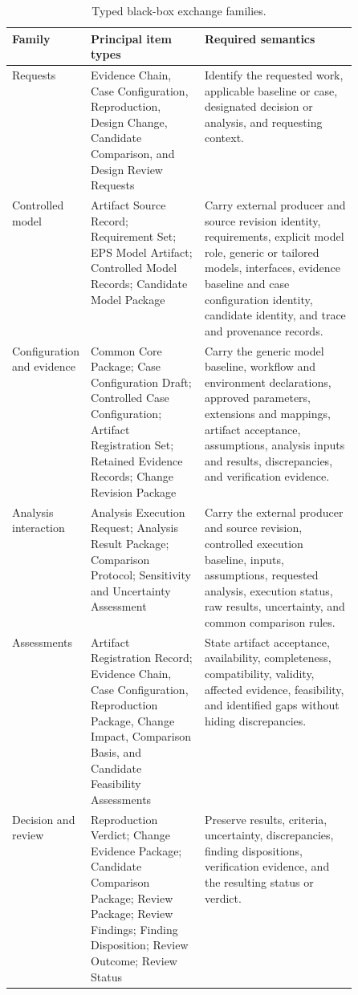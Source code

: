 \documentclass[11pt,a4paper]{article}
\begin{document}
\begin{table}[H]
    \centering
    \small
    \caption{Typed black-box exchange families.}
    \label{tab:framework-exchange-types}
    \begin{tabularx}{\linewidth}{>{\raggedright\arraybackslash}p{0.17\linewidth} >{\raggedright\arraybackslash}p{0.33\linewidth} X}
        \toprule
        \textbf{Family} & \textbf{Principal item types} & \textbf{Required semantics} \\
        \midrule
        Requests & Evidence Chain, Case Configuration, Reproduction, Design Change, Candidate Comparison, and Design Review Requests & Identify the requested work, applicable baseline or case, designated decision or analysis, and requesting context. \\
        Controlled model & Artifact Source Record; Requirement Set; EPS Model Artifact; Controlled Model Records; Candidate Model Package & Carry external producer and source revision identity, requirements, explicit model role, generic or tailored models, interfaces, evidence baseline and case configuration identity, candidate identity, and trace and provenance records. \\
        Configuration and evidence & Common Core Package; Case Configuration Draft; Controlled Case Configuration; Artifact Registration Set; Retained Evidence Records; Change Revision Package & Carry the generic model baseline, workflow and environment declarations, approved parameters, extensions and mappings, artifact acceptance, assumptions, analysis inputs and results, discrepancies, and verification evidence. \\
        Analysis interaction & Analysis Execution Request; Analysis Result Package; Comparison Protocol; Sensitivity and Uncertainty Assessment & Carry the external producer and source revision, controlled execution baseline, inputs, assumptions, requested analysis, execution status, raw results, uncertainty, and common comparison rules. \\
        Assessments & Artifact Registration Record; Evidence Chain, Case Configuration, Reproduction Package, Change Impact, Comparison Basis, and Candidate Feasibility Assessments & State artifact acceptance, availability, completeness, compatibility, validity, affected evidence, feasibility, and identified gaps without hiding discrepancies. \\
        Decision and review & Reproduction Verdict; Change Evidence Package; Candidate Comparison Package; Review Package; Review Findings; Finding Disposition; Review Outcome; Review Status & Preserve results, criteria, uncertainty, discrepancies, finding dispositions, verification evidence, and the resulting status or verdict. \\
        \bottomrule
    \end{tabularx}
\end{table}
\end{document}
